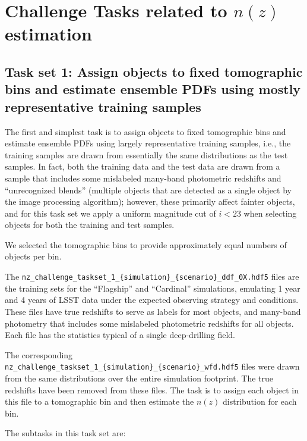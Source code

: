 \documentclass[11pt,twoside,letterpaper,onecolumn,english]{article}
\begin{document}
\section{\texorpdfstring{Challenge Tasks related to $n(z)$ estimation}{Challenge Tasks related to n(z) estimation}}
\label{sec:tasks}

\subsection{Task set 1:  Assign objects to fixed tomographic bins
  and estimate ensemble PDFs using mostly representative
  training samples}

The first and simplest task is to assign objects to fixed tomographic bins and estimate ensemble PDFs using
largely representative training samples, i.e., the training samples are drawn
from essentially the same distributions as the test samples.  In fact, both the training
data and the test data are drawn from a sample that includes
some mislabeled many-band photometric redshifts and ``unrecognized blends'' (multiple objects
that are detected as a single object by the image
processing algorithm); however, these
primarily affect fainter objects, and for this task set we
apply a uniform magnitude cut of $i < 23$ when selecting objects for both
the training and test samples.

We selected the tomographic bins to provide approximately equal numbers of objects per bin.

The
\texttt{nz\_challenge\_taskset\_1\_\{simulation\}\_\{scenario\}\_ddf\_0X.hdf5}
files are the training sets for the ``Flagship'' and ``Cardinal''
simulations, emulating 1 year and 4 years of LSST data under the
expected observing strategy and conditions. These files have true
redshifts to serve as labels for most objects, and many-band photometry that includes
some mislabeled photometric redshifts for all objects.
Each file has the statistics typical of a single
deep-drilling field.

The corresponding
\texttt{nz\_challenge\_taskset\_1\_\{simulation\}\_\{scenario\}\_wfd.hdf5}
files were \allowbreak drawn from the same distributions over the entire simulation
footprint.  The true redshifts have been removed from these files. The task is to assign
each object in this file to a tomographic bin and then estimate the $n(z)$ distribution for
each bin.

The subtasks in this task set are:
\end{document}
